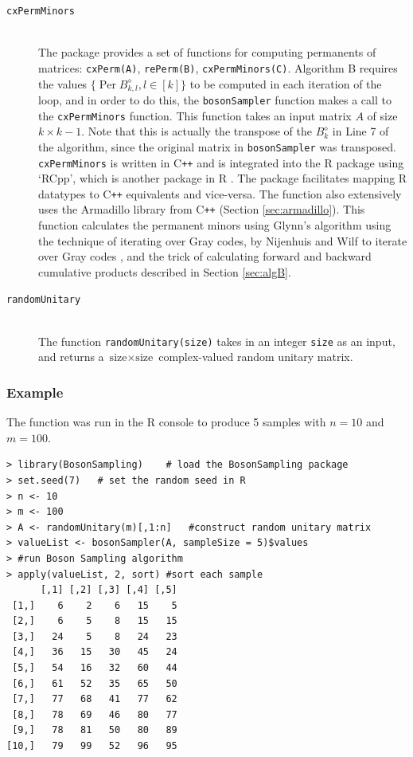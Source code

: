 \documentclass[ %
                    author={Manan Vaswani},
                supervisor={Dr. Raphael Clifford},
                    degree={MEng},
                     title={A multi-core CPU implementation of the classical Boson Sampling algorithm},
                  subtitle={},
                      type={},
                      year={2019} ]{dissertation}
\theoremstyle{plain}
\theoremstyle{definition}
\DeclareMathOperator*{\Per}{\mathrm{Per}}
\begin{document}
\begin{description}
\item[\texttt{cxPermMinors}] \hfill \\ The package provides a set of functions for computing permanents of matrices: \texttt{cxPerm(A)}, \texttt{rePerm(B)}, \texttt{cxPermMinors(C)}. Algorithm B requires the values $\{ \Per B_{k, l}^{\diamond}, l \in [k] \}$ to be computed in each iteration of the loop, and in order to do this, the \texttt{bosonSampler} function makes a call to the \texttt{cxPermMinors} function. This function takes an input matrix $A$ of size $k \times k-1$. Note that this is actually the transpose of the $B_k^{\diamond}$ in Line 7 of the algorithm, since the original matrix in \texttt{bosonSampler} was transposed. \texttt{cxPermMinors} is written in C\texttt{++} and is integrated into the R package using `RCpp', which is another package in R \cite{rcpp}. The package facilitates  mapping R datatypes to C\texttt{++} equivalents and vice-versa. The function also extensively uses the Armadillo library from C\texttt{++} (Section \ref{sec:armadillo}). This function calculates the permanent minors using Glynn's algorithm \cite{glynn2010} using the technique of iterating over Gray codes, by Nijenhuis and Wilf \cite{Nijenhuis1978} to iterate over Gray codes , and the trick of calculating forward and backward cumulative products described in Section \ref{sec:algB}.
\item[\texttt{randomUnitary}] \hfill \\The function \texttt{randomUnitary(size)} takes in an integer \texttt{size} as an input, and returns a $\text{size} \times \text{size}$ complex-valued random unitary matrix.
\end{description}
\subsubsection*{Example}
The function was run in the R console to produce 5 samples with $n = 10$ and $m = 100$.
\begin{verbatim}
> library(BosonSampling)	# load the BosonSampling package
> set.seed(7)	# set the random seed in R
> n <- 10
> m <- 100
> A <- randomUnitary(m)[,1:n]	#construct random unitary matrix
> valueList <- bosonSampler(A, sampleSize = 5)$values
> #run Boson Sampling algorithm
> apply(valueList, 2, sort) #sort each sample
      [,1] [,2] [,3] [,4] [,5]
 [1,]    6    2    6   15    5
 [2,]    6    5    8   15   15
 [3,]   24    5    8   24   23
 [4,]   36   15   30   45   24
 [5,]   54   16   32   60   44
 [6,]   61   52   35   65   50
 [7,]   77   68   41   77   62
 [8,]   78   69   46   80   77
 [9,]   78   81   50   80   89
[10,]   79   99   52   96   95
\end{verbatim}
\end{document}
